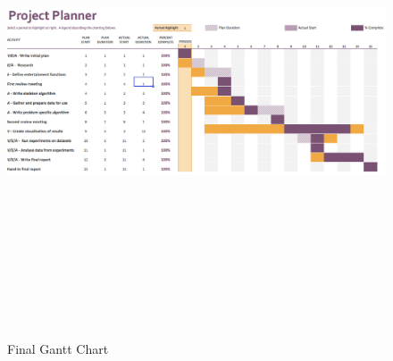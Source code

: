 \documentclass[12pt]{report}
\begin{document}
\clearpage
\begin{landscape}
\begin{figure}
\label{ganttChart}
\caption{Final Gantt Chart}
\includegraphics[height=14.5cm, width=\linewidth]{./FinalPlanWorkChart}
\end{figure}
\end{landscape}

\clearpage
\renewcommand{\bibsection}{\section*{References}}
{}

\end{document}
